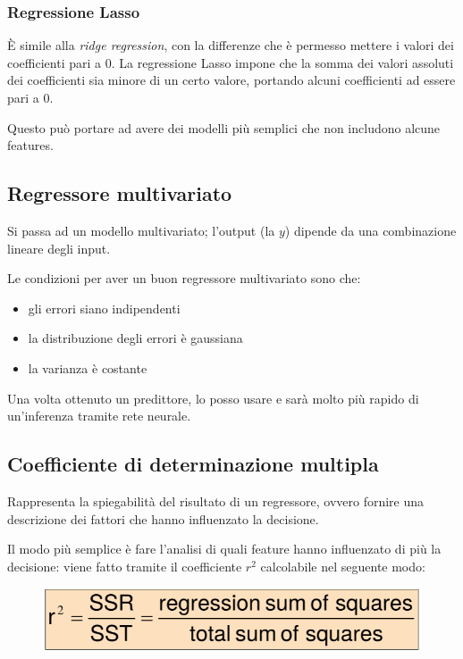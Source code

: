 \documentclass{report}
\begin{document}
\subsubsection{Regressione Lasso}
È simile alla \textit{ridge regression}, con la differenze che è permesso mettere i valori dei coefficienti pari a 0. La regressione Lasso impone 
che la somma dei valori assoluti dei coefficienti sia minore di un certo valore, portando alcuni coefficienti ad essere pari a 0.

\noindent Questo può portare ad avere dei modelli più semplici che non includono alcune features.

\subsection{Regressore multivariato}

Si passa ad un modello multivariato; l'output (la $y$) dipende da una combinazione lineare degli input.

\noindent Le condizioni per aver un buon regressore multivariato sono che:
\begin{itemize}
    \item gli errori siano indipendenti 
    \item la distribuzione degli errori è gaussiana 
    \item la varianza è costante
\end{itemize}

\noindent Una volta ottenuto un predittore, lo posso usare e sarà molto più rapido di un'inferenza tramite rete neurale.

\subsection{Coefficiente di determinazione multipla}

Rappresenta la spiegabilità del risultato di un regressore, ovvero fornire una descrizione dei fattori che hanno influenzato la decisione.

\noindent Il modo più semplice è fare l'analisi di quali feature hanno influenzato di più la decisione: viene fatto tramite il coefficiente $r^2$
calcolabile nel seguente modo:

\begin{figure}[H]
    \centering
    \includegraphics[width=0.6\linewidth]{images/r2.png}
\end{figure}
\end{document}

